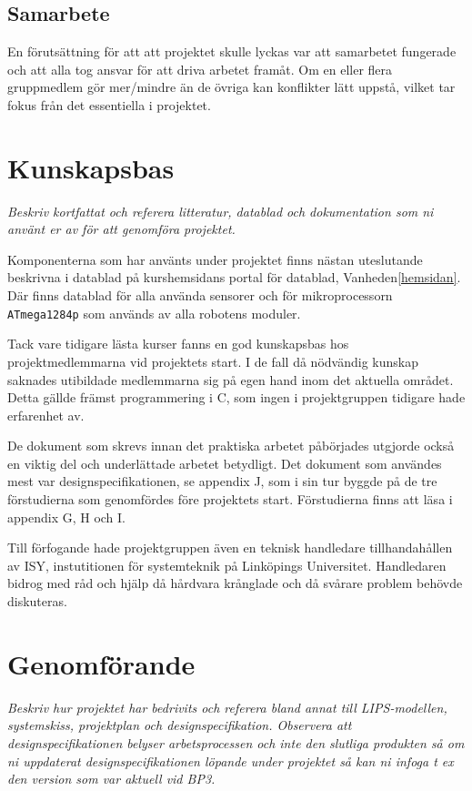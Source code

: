 \documentclass[11pt]{article}
\begin{document}
\begin{flushleft}
\subsection{Samarbete}
En förutsättning för att att projektet skulle lyckas var att samarbetet fungerade och att alla tog ansvar för att driva arbetet framåt. Om en eller flera gruppmedlem gör mer/mindre än de övriga kan konflikter lätt uppstå, vilket tar fokus från det essentiella i projektet.


\pagebreak

\section{Kunskapsbas}
\textit{Beskriv kortfattat och referera litteratur, datablad och dokumentation som ni använt er av för att genomföra projektet.}

Komponenterna som har använts under projektet finns nästan uteslutande beskrivna i datablad på kurshemsidans portal för datablad, Vanheden\ref{hemsidan}. Där finns datablad för alla använda sensorer och för mikroprocessorn \verb+ATmega1284p+ som används av alla robotens moduler.

Tack vare tidigare lästa kurser fanns en god kunskapsbas hos projektmedlemmarna vid projektets start. I de fall då nödvändig kunskap saknades utibildade medlemmarna sig på egen hand inom det aktuella området. Detta gällde främst programmering i C, som ingen i projektgruppen tidigare hade erfarenhet av. 

De dokument som skrevs innan det praktiska arbetet påbörjades utgjorde också en viktig del och underlättade arbetet betydligt. Det dokument som användes mest var designspecifikationen, se appendix J, som i sin tur byggde på de tre förstudierna som genomfördes före projektets start. Förstudierna finns att läsa i appendix G, H och I.

Till förfogande hade projektgruppen även en teknisk handledare tillhandahållen av ISY, instutitionen för systemteknik på Linköpings Universitet. Handledaren bidrog med råd och hjälp då hårdvara krånglade och då svårare problem behövde diskuteras.

\pagebreak

\section{Genomförande}
\textit{Beskriv hur projektet har bedrivits och referera bland annat till LIPS-modellen, systemskiss, projektplan och designspecifikation. Observera att designspecifikationen belyser arbetsprocessen och inte den slutliga produkten så om ni uppdaterat designspecifikationen löpande under projektet så kan ni infoga t ex den version som var aktuell vid BP3.}


\end{flushleft}
\end{document}
